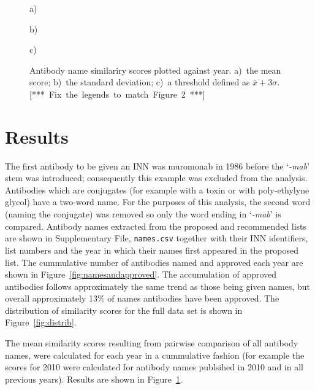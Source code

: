 \documentclass{article}
\newcommand{\eg}[1]{\mbox{`\emph{#1}'}}
\newcommand{\note}[1]{\mbox{\color{red}[*** #1 ***]}}
\begin{document}
\begin{figure}
  \noindent a)

\begin{center}
\end{center}

  \noindent b)

\begin{center}
\end{center}

  \noindent c)

\begin{center}
\end{center}

  
  \caption{\label{fig:results} Antibody name similariry
    scores plotted against year. a)~the mean score; b)~the standard
    deviation; c)~a threshold defined as
    $\bar{x}+3\sigma$. \note{Fix the legends to match Figure~2}}
\end{figure}



\section{Results}
The first antibody to be given an INN was muromonab in 1986 before the
\eg{-mab} stem was introduced; consequently this example was excluded
from the analysis. Antibodies which are conjugates (for example with a
toxin or with poly-ethylyne glycol) have a two-word name. For the
purposes of this analysis, the second word (naming the conjugate) was
removed so only the word ending in \eg{-mab} is compared.  Antibody
names extracted from the proposed and recommended lists are shown in
Supplementary File, {\tt names.csv} together with their INN
identifiers, list numbers and the year in which their names first
appeared in the proposed list. The cummulative number of antibodies
named and approved each year are shown in
Figure~\ref{fig:namesandapproved}. The accumulation of approved
antibodies follows approximately the same trend as those being given
names, but overall approximately 13\% of names antibodies have been
approved. The distribution of similarity scores for the full data set
is shown in Figure~\ref{fig:distrib}.

The mean similarity scores resulting from pairwise comparison of all
antibody names, were calculated for each year in a cummulative fashion
(for example the scores for 2010 were calculated for antibody names
publsihed in 2010 and in all previous years). Results are shown in
Figure~\ref{fig:results}. 
\end{document}
